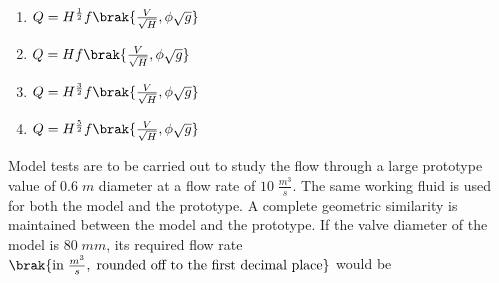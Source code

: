 \begin{enumerate}
    \item $Q=H^\frac{1}{2}f\brak{\frac{V}{\sqrt{H}},\phi\sqrt{g}}$
    \item $Q=H f\brak{\frac{V}{\sqrt{H}},\phi\sqrt{g}}$
    \item $Q=H^\frac{3}{2}f\brak{\frac{V}{\sqrt{H}},\phi\sqrt{g}}$
    \item $Q=H^\frac{5}{2}f\brak{\frac{V}{\sqrt{H}},\phi\sqrt{g}}$
\end{enumerate}
\item Model tests are to be carried out to study the flow through a large prototype value of $0.6\;m$ diameter at a flow rate of $10\;\frac{m^3}{s}$. The same working fluid is used for both the model and the prototype. A complete geometric similarity is maintained between the model and the prototype. If the valve diameter of the model is $80\;mm$, its required flow rate $\brak{\text{in}\;\frac{m^3}{s},\;\text{rounded off to the first decimal place}}$ would be \underline{\hspace{2cm}} 

